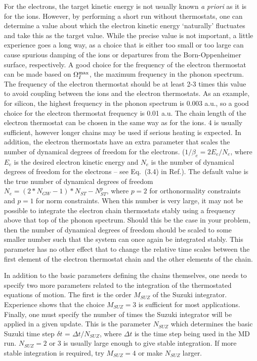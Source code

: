 \documentclass[twoside,10pt,titlepage,a4paper]{article}
\begin{document}
  For the electrons, the target kinetic energy is not usually known {\it a
priori} as it is for the ions. However, by performing a short run without
thermostats, one can determine a value about which the electron kinetic energy
`naturally' fluctuates and take this as the target value. While the precise
value is not important, a little experience goes a long way, as a choice that
is either too small or too large can cause spurious damping of the ions or
departures from the Born-Oppenheimer surface, respectively. A good choice for
the frequency of the electron thermostat can be made based on $\Omega_I^{\rm
max}$, the maximum frequency in the phonon spectrum. The frequency of the
electron thermostat should be at least 2-3 times this value to avoid coupling
between the ions and the electron thermostats. As an example, for silicon, the
highest frequency in the phonon spectrum is 0.003 a.u., so a good choice for
the electron thermostat frequency is 0.01 a.u. The chain length of the electron
thermostat can be chosen in the same way as for the ions. 4 is usually
sufficient, however longer chains may be used if serious heating is expected.
In addition, the electron thermostats have an extra parameter that scales the
number of dynamical degrees of freedom for the electrons. ($1/\beta_e =
2E_e/N_e$, where $E_e$ is the desired electron kinetic energy and $N_e$ is the
number of dynamical degrees of freedom for the electrons -- see Eq.~(3.4) in
Ref.\cite{Tuckerman94}). The default value is the true number of dynamical
degrees of freedom $N_e = (2*N_{GW}-1)*N_{ST} - N_{ST}^p$, where $p=2$ for
orthonormality constraints and $p=1$ for norm constraints. When this number is
very large, it may not be possible to integrate the electron chain thermostats
stably using a frequency above that top of the phonon spectrum. Should this be
the case in your problem, then the number of dynamical degrees of freedom
should be scaled to some smaller number such that the system can once again be
integrated stably. This parameter has no other effect that to change the
relative time scales between the first element of the electron thermostat chain
and the other elements of the chain.

  In addition to the basic parameters defining the chains themselves, one needs
to specify two more parameters related to the integration of the thermostated
equations of motion. The first is the order $M_{SUZ}$ of the Suzuki integrator.
Experience shows that the choice $M_{SUZ}=3$ is sufficient for most
applications. Finally, one must specify the number of times the Suzuki
integrator will be applied in a given update. This is the parameter $N_{SUZ}$
which determines the basic Suzuki time step $\delta t$ = $\Delta t/N_{SUZ}$,
where $\Delta t$ is the time step being used in the MD run. $N_{SUZ} =2$ or 3
is usually large enough to give stable integration. If more stable integration
is required, try $M_{SUZ}=4$ or make $N_{SUZ}$ larger.
\end{document}
